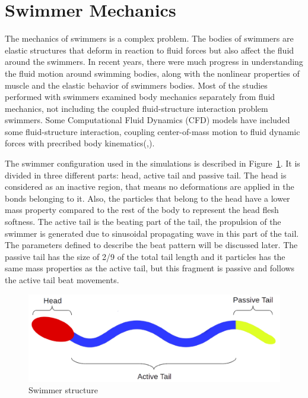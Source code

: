 \section{Swimmer Mechanics}
\label{sec:section 2}
The mechanics of swimmers is a complex problem\cite{tytell_interactions_2010}. The bodies of swimmers are elastic structures that deform in reaction to fluid forces but also affect the fluid around the swimmers.
In recent years, there were much progress in understanding the fluid motion around swimming bodies\cite{shadwick_fish_2006}, along with the nonlinear properties of muscle\cite{williams_new_2010} and the elastic behavior of 
swimmers bodies\cite{williams_new_2010}. Most of the studies performed with swimmers examined body mechanics separately from fluid mechanics, not including the coupled
fluid-structure interaction problem swimmers. Some Computational Fluid Dynamics (CFD) models have included some fluid-structure interaction, coupling center-of-mass motion to 
fluid dynamic forces with precribed body kinematics(\cite{kern_simulations_2006},\cite{borazjani_role_2010}).

\par

The swimmer configuration used in the simulations is described in Figure~\ref{fig:Bild1}. It is divided in three different parts: head, active tail and passive tail. The head 
is considered as an inactive region, that means no deformations are applied in the bonds belonging to it. Also, the particles that belong to the head have a lower mass property
compared to the rest of the body to represent the head flesh softness. The active tail is the beating part of the tail, the propulsion of the swimmer is generated due to sinusoidal 
propagating wave in this part of the tail. The parameters defined to describe the beat pattern will be discussed later. The passive tail has the size of 2/9 of the total tail length
and it particles has the same mass properties as the active tail, but this fragment is passive and follows the active tail beat movements. 


\begin{figure}[ht]
  \centering
  \begin{footnotesize}
  \includegraphics[scale=0.25]{images/swimmer-struc.png}
  \caption[Swimmer Structure]{Swimmer structure}
  \label{fig:Bild1}
  \end{footnotesize}
\end{figure} 


